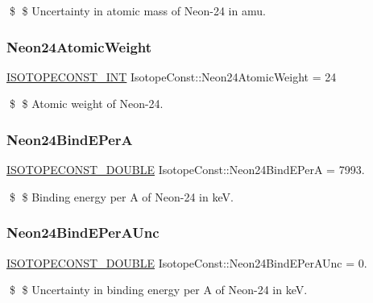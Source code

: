 \$ \$ Uncertainty in atomic mass of Neon-\/24 in amu. \mbox{\label{group___isotope_const-_neon-_ne24_ga2bf57c744b2e46f2e37650d6c08f5903}} 
\subsubsection{\texorpdfstring{Neon24\+Atomic\+Weight}{Neon24AtomicWeight}}
{\footnotesize\ttfamily \mbox{\hyperlink{group___isotope_const-_macros_ga5f18360b3e99483a35c32d789e62621c}{I\+S\+O\+T\+O\+P\+E\+C\+O\+N\+S\+T\+\_\+\+I\+NT}} Isotope\+Const\+::\+Neon24\+Atomic\+Weight = 24}

\$ \$ Atomic weight of Neon-\/24. \mbox{\label{group___isotope_const-_neon-_ne24_ga269da69f308017092b345b2eb7a3de54}} 
\subsubsection{\texorpdfstring{Neon24\+Bind\+E\+PerA}{Neon24BindEPerA}}
{\footnotesize\ttfamily \mbox{\hyperlink{group___isotope_const-_macros_ga8f45a7272ce02c0b4c65c44636ed719a}{I\+S\+O\+T\+O\+P\+E\+C\+O\+N\+S\+T\+\_\+\+D\+O\+U\+B\+LE}} Isotope\+Const\+::\+Neon24\+Bind\+E\+PerA = 7993.}

\$ \$ Binding energy per A of Neon-\/24 in keV. \mbox{\label{group___isotope_const-_neon-_ne24_gad3ed0fa5ae2006f4ae596cc3ad73839c}} 
\subsubsection{\texorpdfstring{Neon24\+Bind\+E\+Per\+A\+Unc}{Neon24BindEPerAUnc}}
{\footnotesize\ttfamily \mbox{\hyperlink{group___isotope_const-_macros_ga8f45a7272ce02c0b4c65c44636ed719a}{I\+S\+O\+T\+O\+P\+E\+C\+O\+N\+S\+T\+\_\+\+D\+O\+U\+B\+LE}} Isotope\+Const\+::\+Neon24\+Bind\+E\+Per\+A\+Unc = 0.}

\$ \$ Uncertainty in binding energy per A of Neon-\/24 in keV. \mbox{\label{group___isotope_const-_neon-_ne24_ga12722f4653a5a71b533949851331f10c}} 
